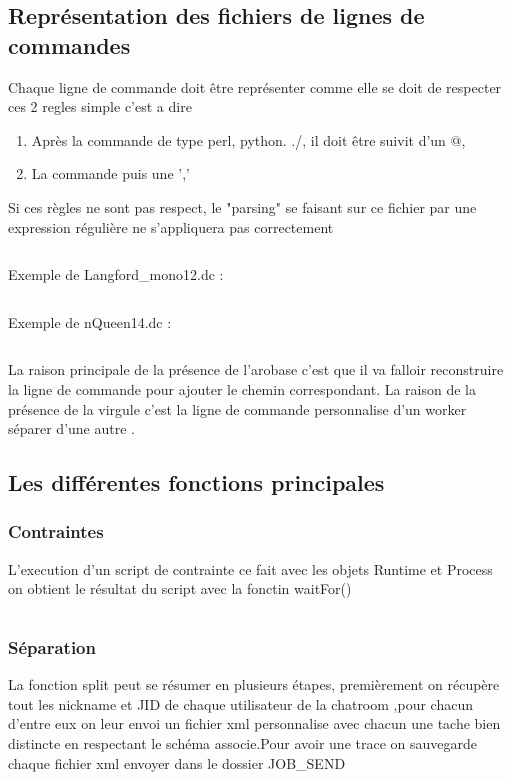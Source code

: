 \documentclass[11pt]{article}
\begin{document}
\subsection{Représentation des fichiers de lignes de commandes} 
Chaque ligne de commande doit être représenter comme elle se doit de respecter ces 2 regles simple 
c'est a dire 
\begin{enumerate}
\item Après la commande de type perl, python. ./, il doit être suivit d'un @,  
\item La commande puis une ','
\end{enumerate}
Si ces règles ne sont pas respect, le "parsing" se faisant sur ce fichier par une expression régulière ne s\textquoteright appliquera pas correctement  
\inputminted{perl}{../Echantillon_Script_Cmd/Toto.dc}
Exemple de Langford\_mono12.dc :
\inputminted{perl}{../Echantillon_Script_Cmd/Langford_mono12.dc}
Exemple de nQueen14.dc :
\inputminted{perl}{../Echantillon_Script_Cmd/nQuenn14.dc}

La raison principale de la présence de l'arobase c'est que il va falloir reconstruire la ligne de commande pour ajouter le chemin correspondant.
La raison de la présence de la virgule c'est la ligne de commande personnalise d'un worker séparer d'une autre .
\newpage
\subsection{Les différentes fonctions principales}

\subsubsection{Contraintes} 
L'execution d'un script de contrainte ce fait avec les objets Runtime et Process on obtient le résultat du script avec la fonctin waitFor() 
\inputminted{perl}{../Echantillon_Script_Perl/OSname.pl}
\newpage
\subsubsection{Séparation} 
La fonction split peut se résumer en plusieurs étapes, premièrement on récupère tout les nickname et JID de chaque utilisateur de la chatroom ,pour chacun d'entre eux on leur envoi un fichier xml personnalise avec chacun une tache bien distincte en respectant le schéma associe.Pour avoir une trace on sauvegarde chaque fichier xml envoyer dans le dossier JOB\_SEND
\inputminted[tabsize=2,frame=lines,linenos]{java}{Fichier_import/split.java}
\end{document}
